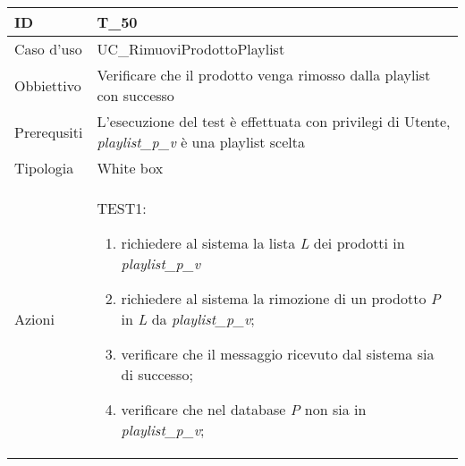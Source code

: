 \begin{table}[hb]
    \centering
    \begin{tabular}{ |p{2cm}|p{10cm}|  }
        \hline
        ID          & T\_50                                                                 \\\hline
        Caso d'uso  & UC\_RimuoviProdottoPlaylist                                                    \\\hline
        Obbiettivo  & Verificare che il prodotto venga rimosso dalla playlist con successo \\\hline
        Prerequsiti & L'esecuzione del test è effettuata con privilegi di Utente, \emph{playlist\_p\_v}
        è una playlist scelta \\\hline
        Tipologia   & White box                                                             \\\hline
        Azioni      &
        TEST1:
        \begin{enumerate}[nosep, topsep=0pt]
            \item richiedere al sistema la lista \emph{L} dei prodotti in \emph{playlist\_p\_v}
            \item richiedere al sistema la rimozione di un prodotto \emph{P} in \emph{L} da \emph{playlist\_p\_v};
            \item verificare che il messaggio ricevuto dal sistema sia di successo;
            \item verificare che nel database \emph{P} non sia in \emph{playlist\_p\_v};
        \end{enumerate}
        \\\hline
    \end{tabular}
\end{table}

